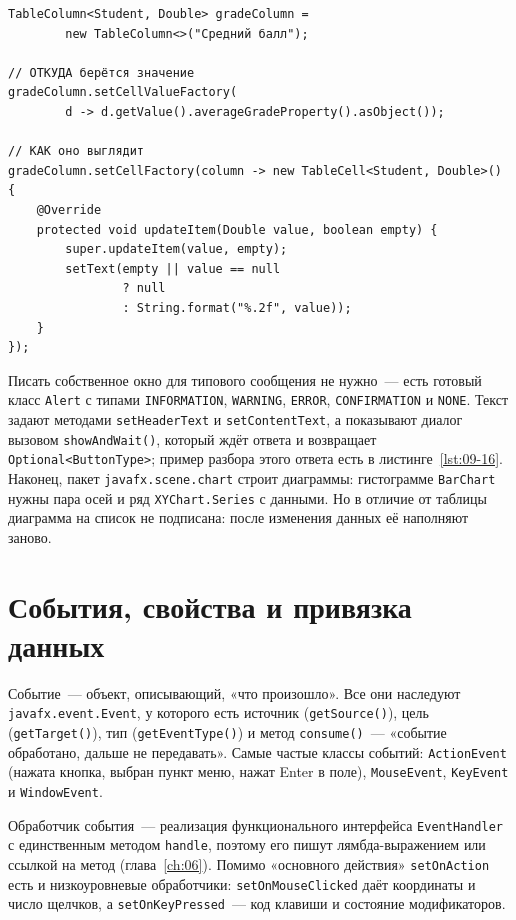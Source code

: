 \begin{listing}[H]
\begin{verbatim}
TableColumn<Student, Double> gradeColumn =
        new TableColumn<>("Средний балл");

// ОТКУДА берётся значение
gradeColumn.setCellValueFactory(
        d -> d.getValue().averageGradeProperty().asObject());

// КАК оно выглядит
gradeColumn.setCellFactory(column -> new TableCell<Student, Double>() {
    @Override
    protected void updateItem(Double value, boolean empty) {
        super.updateItem(value, empty);
        setText(empty || value == null
                ? null
                : String.format("%.2f", value));
    }
});
\end{verbatim}
\caption{Форматирование значения в ячейке}
\label{lst:09-9}
\end{listing}

Писать собственное окно для типового сообщения не нужно~--- есть готовый класс
\texttt{Alert} с типами \texttt{INFORMATION}, \texttt{WARNING}, \texttt{ERROR},
\texttt{CONFIRMATION} и \texttt{NONE}. Текст задают методами
\texttt{setHeaderText} и \texttt{setContentText}, а показывают диалог вызовом
\texttt{showAndWait()}, который ждёт ответа и возвращает
\texttt{Optional<ButtonType>}; пример разбора этого ответа есть в
листинге~\ref{lst:09-16}. Наконец, пакет \texttt{javafx.scene.chart} строит
диаграммы: гистограмме \texttt{BarChart} нужны пара осей и ряд
\texttt{XYChart.Series} с данными. Но в отличие от таблицы диаграмма на список
не подписана: после изменения данных её наполняют заново.

\section{События, свойства и привязка данных}

Событие~--- объект, описывающий, «что произошло». Все они наследуют
\texttt{javafx.event.Event}, у которого есть источник (\texttt{getSource()}),
цель (\texttt{getTarget()}), тип (\texttt{getEventType()}) и метод
\texttt{consume()}~--- «событие обработано, дальше не передавать». Самые частые
классы событий: \texttt{ActionEvent} (нажата кнопка, выбран пункт меню, нажат
Enter в поле), \texttt{MouseEvent}, \texttt{KeyEvent} и \texttt{WindowEvent}.

Обработчик события~--- реализация функционального интерфейса
\texttt{EventHandler} с единственным методом \texttt{handle}, поэтому его пишут
лямбда-выражением или ссылкой на метод (глава~\ref{ch:06}). Помимо «основного
действия» \texttt{setOnAction} есть и низкоуровневые обработчики:
\texttt{setOnMouseClicked} даёт координаты и число щелчков, а
\texttt{setOnKeyPressed}~--- код клавиши и состояние модификаторов.

